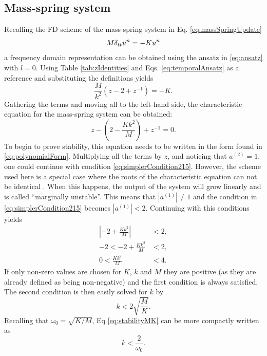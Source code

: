 {{\subsection{Mass-spring system}\label{sec:massSpringStability}
Recalling the FD scheme of the mass-spring system in Eq. \eqref{eq:massSpringUpdate}
\begin{equation*}
    M \delta_{tt} u^n = -K u^n
\end{equation*} 
a frequency domain representation can be obtained using the ansatz in \eqref{eq:ansatz} with $l = 0$. Using Table \ref{tab:zIdentities} and Eqs. \eqref{eq:temporalAnsatz} as a reference and substituting the definitions yields
\begin{equation*}
    \frac{M}{k^2}\left(z -2 +z^{-1}\right) = -K.
\end{equation*}
Gathering the terms and moving all to the left-hand side, the characteristic equation for the mass-spring system can be obtained:
\begin{equation}\label{eq:massSpringCharacteristic}
    z - \left(2-\frac{Kk^2}{M} \right) + z^{-1} = 0. 
\end{equation}
To begin to prove stability, this equation needs to be written in the form found in \eqref{eq:polynomialForm}. Multiplying all the terms by $z$, and noticing that $a^{(2)} = 1$, one could continue with condition \eqref{eq:simplerCondition215}. However, the scheme used here is a special case where the roots of the characteristic equation can not be identical \cite{theBible}. When this happens, the output of the system will grow linearly and is called ``marginally unstable''. This means that $|a^{(1)}|\neq 1$ and the condition in \eqref{eq:simplerCondition215} becomes $|a^{(1)}|<2$. Continuing with this conditions yields
\begin{align*}
    \left|-2+\frac{Kk^2}{M}\right| &< 2,\\
    -2 < -2+\frac{Kk^2}{M} &< 2,\\
    0 < \frac{Kk^2}{M} &< 4.
\end{align*}
If only non-zero values are chosen for $K$, $k$ and $M$ they are positive (as they are already defined as being non-negative) and the first condition is always satisfied. The second condition is then easily solved for $k$ by
\begin{equation}\label{eq:stabilityMK}
    k < 2\sqrt{\frac{M}{K}}.
\end{equation}
Recalling that $\omega_0 = \sqrt{K/M}$, Eq \eqref{eq:stabilityMK} can be more compactly written as 
\begin{equation}
    k <\frac{2}{\omega_0}.
\end{equation}

}}
